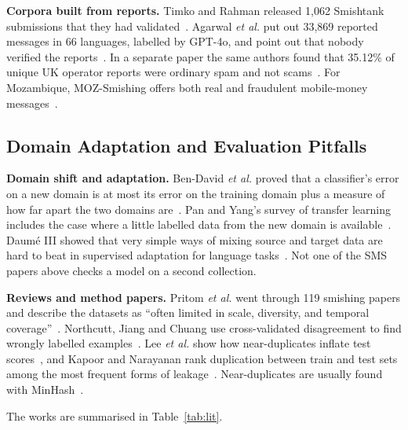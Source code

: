 \textbf{Corpora built from reports.} Timko and Rahman released 1,062 Smishtank submissions that they had validated~\cite{timko2024smishing}. Agarwal \textit{et al.} put out 33,869 reported messages in 66 languages, labelled by GPT-4o, and point out that nobody verified the reports~\cite{agarwal2025fishing}. In a separate paper the same authors found that 35.12\% of unique UK operator reports were ordinary spam and not scams~\cite{agarwal2026overview}. For Mozambique, MOZ-Smishing offers both real and fraudulent mobile-money messages~\cite{ali2025moz}.

\subsection{Domain Adaptation and Evaluation Pitfalls}
\textbf{Domain shift and adaptation.} Ben-David \textit{et al.} proved that a classifier's error on a new domain is at most its error on the training domain plus a measure of how far apart the two domains are~\cite{bendavid2010theory}. Pan and Yang's survey of transfer learning includes the case where a little labelled data from the new domain is available~\cite{pan2010survey}. Daum\'e III showed that very simple ways of mixing source and target data are hard to beat in supervised adaptation for language tasks~\cite{daume2007frustratingly}. Not one of the SMS papers above checks a model on a second collection.

\textbf{Reviews and method papers.} Pritom \textit{et al.} went through 119 smishing papers and describe the datasets as ``often limited in scale, diversity, and temporal coverage''~\cite{pritom2026sms}. Northcutt, Jiang and Chuang use cross-validated disagreement to find wrongly labelled examples~\cite{northcutt2021confident}. Lee \textit{et al.} show how near-duplicates inflate test scores~\cite{lee2022dedup}, and Kapoor and Narayanan rank duplication between train and test sets among the most frequent forms of leakage~\cite{kapoor2023leakage}. Near-duplicates are usually found with MinHash~\cite{broder1997resemblance}.

The works are summarised in Table~\ref{tab:lit}.

